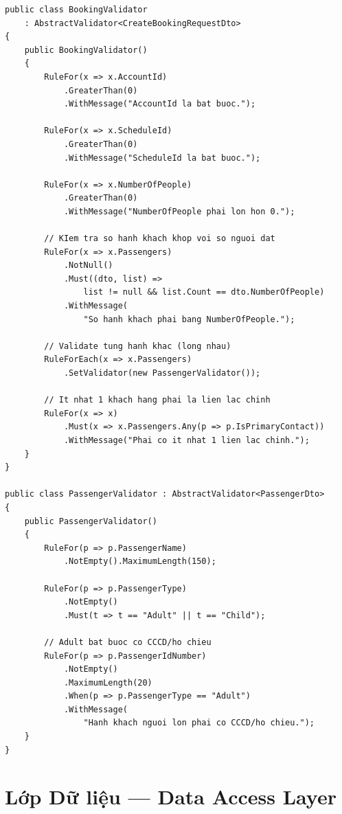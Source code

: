 \begin{lstlisting}[style=csharp,
  caption={BookingValidator với FluentValidation lồng nhau},
  label={lst:validator}]
public class BookingValidator
    : AbstractValidator<CreateBookingRequestDto>
{
    public BookingValidator()
    {
        RuleFor(x => x.AccountId)
            .GreaterThan(0)
            .WithMessage("AccountId la bat buoc.");

        RuleFor(x => x.ScheduleId)
            .GreaterThan(0)
            .WithMessage("ScheduleId la bat buoc.");

        RuleFor(x => x.NumberOfPeople)
            .GreaterThan(0)
            .WithMessage("NumberOfPeople phai lon hon 0.");

        // KIem tra so hanh khach khop voi so nguoi dat
        RuleFor(x => x.Passengers)
            .NotNull()
            .Must((dto, list) =>
                list != null && list.Count == dto.NumberOfPeople)
            .WithMessage(
                "So hanh khach phai bang NumberOfPeople.");

        // Validate tung hanh khac (long nhau)
        RuleForEach(x => x.Passengers)
            .SetValidator(new PassengerValidator());

        // It nhat 1 khach hang phai la lien lac chinh
        RuleFor(x => x)
            .Must(x => x.Passengers.Any(p => p.IsPrimaryContact))
            .WithMessage("Phai co it nhat 1 lien lac chinh.");
    }
}

public class PassengerValidator : AbstractValidator<PassengerDto>
{
    public PassengerValidator()
    {
        RuleFor(p => p.PassengerName)
            .NotEmpty().MaximumLength(150);

        RuleFor(p => p.PassengerType)
            .NotEmpty()
            .Must(t => t == "Adult" || t == "Child");

        // Adult bat buoc co CCCD/ho chieu
        RuleFor(p => p.PassengerIdNumber)
            .NotEmpty()
            .MaximumLength(20)
            .When(p => p.PassengerType == "Adult")
            .WithMessage(
                "Hanh khach nguoi lon phai co CCCD/ho chieu.");
    }
}
\end{lstlisting}

\section{Lớp Dữ liệu — Data Access Layer}\label{Sec3.4}

